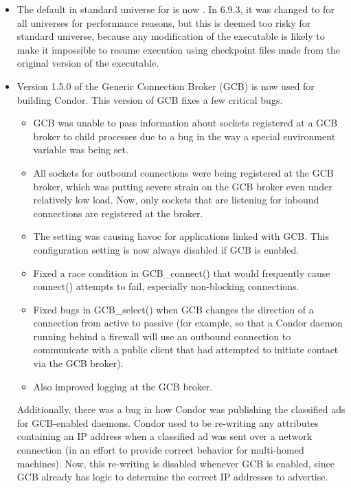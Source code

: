 \begin{itemize}

\item The default in standard universe for 
is now .  In 6.9.3, it was changed to  for all
universes for performance reasons, but this is deemed too risky for
standard universe, because any modification of the executable is
likely to make it impossible to resume execution using checkpoint
files made from the original version of the executable.

\item Version 1.5.0 of the Generic Connection Broker (GCB) is
  now used for building Condor.
  This version of GCB fixes a few critical bugs.
  \begin{itemize}
    \item GCB was unable to pass information about sockets registered
      at a GCB broker to child processes due to a bug in the way a
      special environment variable was being set.
    \item All sockets for outbound connections were being registered
      at the GCB broker, which was putting severe strain on the GCB
      broker even under relatively low load.
      Now, only sockets that are listening for inbound connections are
      registered at the broker.
    \item The  setting was
      causing havoc for applications linked with GCB.
      This configuration setting is now always disabled if GCB is enabled.
    \item Fixed a race condition in GCB\_connect() that would
      frequently cause connect() attempts to fail, especially
      non-blocking connections.
    \item Fixed bugs in GCB\_select() when GCB changes the direction
      of a connection from active to passive (for example, so that a
      Condor daemon running behind a firewall will use an outbound
      connection to communicate with a public client that had
      attempted to initiate contact via the GCB broker).
    \item Also improved logging at the GCB broker.
  \end{itemize}

  Additionally, there was a bug in how Condor was publishing the
  classified ads for GCB-enabled daemons.
  Condor used to be re-writing any attributes containing an IP address
  when a classified ad was sent over a network connection (in an
  effort to provide correct behavior for multi-homed machines).
  Now, this re-writing is disabled whenever GCB is enabled, since GCB
  already has logic to determine the correct IP addresses to advertise.


\end{itemize}
